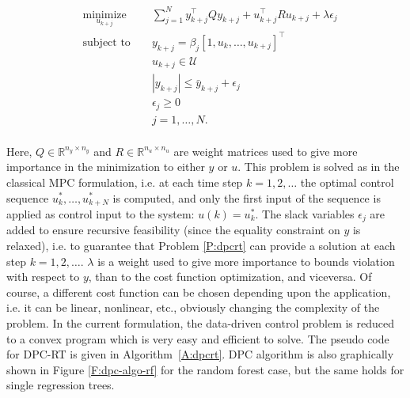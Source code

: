 \begin{problem}\label{P:dpcrt}
	\begin{equation}
	\begin{aligned}
	& \underset{u_{k+j}}{\text{minimize}} & & \sum_{j=1}^{N} y^\top_{k+j} Q y_{k+j} + u^\top_{k+j} R u_{k+j} + \lambda\epsilon_j \\
	& \text{subject to }                  & & y_{k+j}     =   \beta_j [1,u_{k},\ldots,u_{k+j} ]^\top                             \\
	&                                     & & u_{k+j}    \in  \mathcal{U}                                                        \\
	&                                     & & |y_{k+j}|  \leq \bar{y}_{k+j} + \epsilon_j 										 \\
	&                                     & & \epsilon_j \geq  0							                                     \\
	&                                     & & j           =    1,\ldots,N.            									         \\
	\end{aligned}
	\label{E:dpcrt}
	\end{equation}
\end{problem}

\textcolor[rgb]{0,0,1}{Here, $Q \in \mathbb{R}^{n_y\times n_y}$ and $R \in \mathbb{R}^{n_u\times n_u}$ are weight matrices used to give more importance in the minimization to either $y$ or $u$.
This problem is solved as in the classical MPC formulation, i.e. at each time step $k=1,2,\ldots$ the optimal control sequence $u^*_k,\ldots,u^*_{k+N}$ is computed, and only the first input of the sequence is applied as control input to the system: $u(k) = u^*_k$.
The slack variables $\epsilon_j$ are added to ensure recursive feasibility (since the equality constraint on $y$ is relaxed), i.e. to guarantee that Problem \ref{P:dpcrt} can provide a solution at each step $k=1,2,\ldots$.
$\lambda$ is a weight used to give more importance to bounds violation with respect to $y$, than to the cost function optimization, and viceversa. 
Of course, a different cost function can be chosen depending upon the application, i.e. it can be linear, nonlinear, etc., obviously changing the complexity of the problem.
In the current formulation, the data-driven control problem is reduced to a convex program which is very easy and efficient to solve.}
The pseudo code for DPC-RT is given in Algorithm~\ref{A:dpcrt}.
\textcolor[rgb]{0,0,1}{DPC algorithm is also graphically shown in Figure \ref{F:dpc-algo-rf} for the random forest case, but the same holds for single regression trees.}

